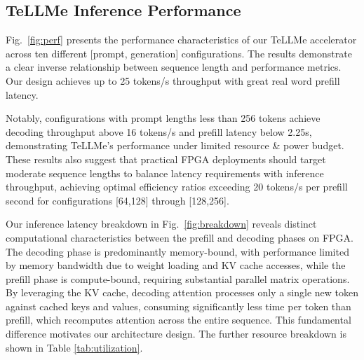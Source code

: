\documentclass[sigconf]{acmart}
\begin{document}
\subsection{TeLLMe Inference Performance}
Fig.~\ref{fig:perf} presents the performance characteristics of our TeLLMe accelerator across ten different [prompt, generation] configurations. The results demonstrate a clear inverse relationship between sequence length and performance metrics. Our design achieves up to 25 tokens/s throughput with great real word prefill latency. 

Notably, configurations with prompt lengths less than 256 tokens achieve decoding throughput above 16 tokens/s and prefill latency below 2.25s, demonstrating TeLLMe's performance under limited resource \& power budget. These results also suggest that practical FPGA deployments should target moderate sequence lengths to balance latency requirements with inference throughput, achieving optimal efficiency ratios exceeding 20 tokens/s per prefill second for configurations [64,128] through [128,256].

Our inference latency breakdown in Fig.~\ref{fig:breakdown} reveals distinct computational characteristics between the prefill and decoding phases on FPGA. The decoding phase is predominantly memory-bound, with performance limited by memory bandwidth due to weight loading and KV cache accesses, while the prefill phase is compute-bound, requiring substantial parallel matrix operations. By leveraging the KV cache, decoding attention processes only a single new token against cached keys and values, consuming significantly less time per token than prefill, which recomputes attention across the entire sequence. This fundamental difference motivates our architecture design.
The further resource breakdown is shown in Table \ref{tab:utilization}. 

\end{document}
